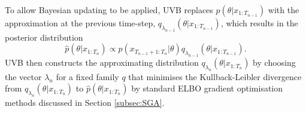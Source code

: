 \documentclass[12pt,a4paper]{article}\usepackage[]{graphicx}\usepackage[]{color}
\begin{document}
To allow Bayesian updating to be applied, UVB replaces $p(\theta | x_{1:T_{n-1}})$ with the approximation at the previous time-step, $q_{\lambda_{n-1}}(\theta | x_{1:T_{n-1}})$, which results in the posterior distribution
\begin{equation}
\label{pHatPosterior}
\hat{p}(\theta |  x_{1:T_{n}}) \propto p(x_{T_{n-1}+1:T_{n}} | \theta)q_{\lambda_{n-1}}(\theta | x_{1:T_{n-1}}).
\end{equation}
UVB then constructs the approximating distribution $q_{\lambda_{n}}(\theta | x_{1:T_{n}})$ by choosing the vector $\lambda_{n}$ for a fixed family $q$ that minimises the Kullback-Leibler divergence from $q_{\lambda_{n}}(\theta | x_{1:T_{n}})$ to $\hat{p}(\theta |  x_{1:T_{n}})$ by standard ELBO gradient optimisation methods discussed in Section \ref{subsec:SGA}.
\\

\iffalse
The ELBO gradient estimators to construct the updated Variational Bayes approximation $q_{\lambda_{n}}(\theta | x_{1:T_{n}})$, can be obtained by substituting 
\begin{equation}
\label{ApproxJoint}
\hat{p}(\theta |  x_{1:T_{n}}) = p(x_{T_{n-1}+1:T_{n}} | \theta)q_{\lambda_{n-1}}(\theta | x_{1:T_{n-1}}).
\end{equation}
into the score gradient estimator (\ref{scoreDeriv}) or the reparameterised gradient estimator (\ref{rpDeriv}). The updating score estimator is given by
\begin{align}
\widehat{\frac{\partial\mathcal{L}(q, \lambda_{n})}{\partial \lambda_{n}}}_{USC} &= \sum_{j = 1}^M \frac{\partial \log(q_{\lambda_{n}}(\theta_{j} | x_{1:T_{n}}))}{\partial \lambda_{n}} \nonumber \\
&\times \left(\log(q_{\lambda_{n-1}}(\theta_{j} | x_{1:T_{n-1}})p(x_{T_{n-1}+1:T_{n}} | x_{1:T_{n-1}}, \theta)) - \log(q_{\lambda_{n}}(\theta_{j} | x_{1:T_{n}})) \right) \label{scoreUpdate}
\end{align}
where $\theta_{j} \sim q_{\lambda_{n}}(\theta | x_{1:T_{n}})$. Similarly, the updating reparameterised estimator is given by
\begin{align}
\widehat{\frac{\partial\mathcal{L}(q, \lambda_{n})}{\partial \lambda_{n}}}_{URP} &= \sum_{j = 1}^M \frac{\partial f(\lambda_{n}, \epsilon_j)}{\partial \lambda_{n}} \frac{\partial \log(q_{\lambda_{n-1}}(\theta |x_{1:T_{n-1}})p(x_{T_{n-1}+1:T_{n}} | x_{1:T_{n-1}}, \theta))}{\partial \theta} \bigg\rvert_{\theta = f(\lambda_{n}, \epsilon_j)} \nonumber \\
& + \frac{\partial \log(J(\lambda_{n}, \epsilon_j))}{\partial \lambda_{n}}, \label{rpUpdate}
\end{align}
where $\epsilon_j \sim r(\epsilon)$. 
\fi
\end{document}
